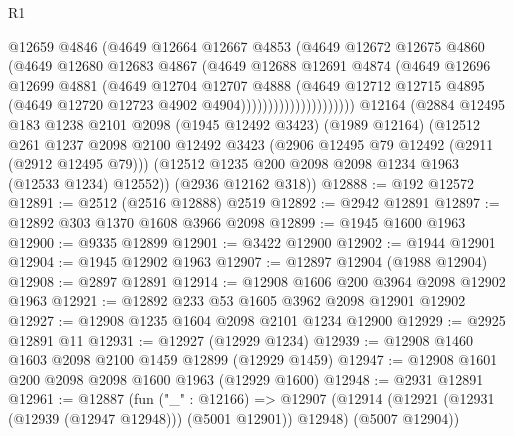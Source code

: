 \begin{lexlean}{R1}
\begin{coremodule}
                              @12659
                              @4846
                              (@4649
                                @12664
                                @12667
                                @4853
                                (@4649
                                  @12672
                                  @12675
                                  @4860
                                  (@4649
                                    @12680
                                    @12683
                                    @4867
                                    (@4649
                                      @12688
                                      @12691
                                      @4874
                                      (@4649
                                        @12696
                                        @12699
                                        @4881
                                        (@4649
                                          @12704
                                          @12707
                                          @4888
                                          (@4649
                                            @12712
                                            @12715
                                            @4895
                                            (@4649 @12720 @12723 @4902 @4904)))))))))))))))))))))
    @12164
    (@2884
      @12495
      @183
      @1238
      @2101
      @2098
      (@1945 @12492 @3423)
      (@1989 @12164)
      (@12512
        @261
        @1237
        @2098
        @2100
        @12492
        @3423
        (@2906 @12495 @79 @12492 (@2911 (@2912 @12495 @79)))
        (@12512 @1235 @200 @2098 @2098 @1234 @1963 (@12533 @1234) @12552))
      (@2936 @12162 @318))
@12888 := @192 @12572
@12891 := @2512 (@2516 @12888) @2519
@12892 := @2942 @12891
@12897 := @12892 @303 @1370 @1608 @3966 @2098
@12899 := @1945 @1600 @1963
@12900 := @9335 @12899
@12901 := @3422 @12900
@12902 := @1944 @12901
@12904 := @1945 @12902 @1963
@12907 := @12897 @12904 (@1988 @12904)
@12908 := @2897 @12891
@12914 := @12908 @1606 @200 @3964 @2098 @12902 @1963
@12921 := @12892 @233 @53 @1605 @3962 @2098 @12901 @12902
@12927 := @12908 @1235 @1604 @2098 @2101 @1234 @12900
@12929 := @2925 @12891 @11
@12931 := @12927 (@12929 @1234)
@12939 := @12908 @1460 @1603 @2098 @2100 @1459 @12899 (@12929 @1459)
@12947 := @12908 @1601 @200 @2098 @2098 @1600 @1963 (@12929 @1600)
@12948 := @2931 @12891
@12961 := @12887
    (fun ("_" : @12166) =>
    @12907 (@12914 (@12921 (@12931 (@12939 (@12947 @12948))) (@5001 @12901)) @12948) (@5007 @12904))

\end{coremodule}
\end{lexlean}
